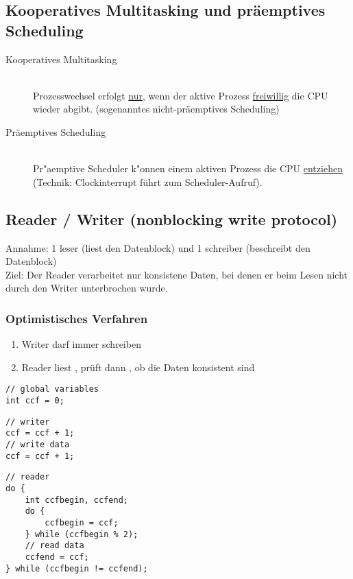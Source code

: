 \subsection{Kooperatives Multitasking und präemptives Scheduling}

\begin{description}
\item [Kooperatives Multitasking] \hfill \\
	Prozesswechsel erfolgt \ul{nur}, wenn der aktive Prozess \ul{freiwillig} die CPU wieder abgibt. (sogenanntes nicht-präemptives Scheduling)
\item [Präemptives Scheduling] \hfill \\
	Pr"aemptive Scheduler k"onnen einem aktiven Prozess die CPU \uline{entziehen} (Technik: Clockinterrupt führt zum Scheduler-Aufruf).
\end{description}


\subsection{Reader / Writer (nonblocking write protocol)}
Annahme: 1 leser (liest den Datenblock) und 1 schreiber (beschreibt den Datenblock) \\
Ziel: Der Reader verarbeitet nur konsistene Daten, bei denen er beim Lesen nicht durch den Writer unterbrochen wurde.

\subsubsection{Optimistisches Verfahren}
\begin{enumerate}
\item Writer darf immer schreiben
\item Reader liest , prüft dann , ob die Daten konsistent sind
\end{enumerate}

\begin{lstlisting}
// global variables
int ccf = 0;
\end{lstlisting}

\begin{lstlisting}
// writer
ccf = ccf + 1;
// write data
ccf = ccf + 1; 
\end{lstlisting}

\begin{lstlisting}
// reader
do {
	int ccfbegin, ccfend;
	do {
		ccfbegin = ccf;
	} while (ccfbegin % 2);
	// read data
	ccfend = ccf;
} while (ccfbegin != ccfend);
\end{lstlisting}


